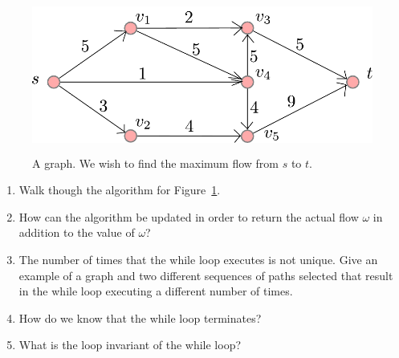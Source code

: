 \documentclass{article}
\begin{document}
\begin{figure}
\centering
\includegraphics[height=2in]{figs/graph}
\caption{A graph.  We wish to find the maximum flow from $s$ to
$t$.}\label{fig:graph}
\end{figure}

\newpage
\begin{enumerate}
\item Walk though the algorithm for Figure~\ref{fig:graph}.
\item How can the algorithm be updated in order to return the actual flow
$\omega$ in addition to the value of $\omega$?
\item The number of times that the while loop executes is not unique.  Give
an example of a graph and two different sequences of paths selected that
result in the while loop executing a different number of times.
\item How do we know that the while loop terminates?
\item What is the loop invariant of the while loop?
\end{enumerate}
\end{document}
